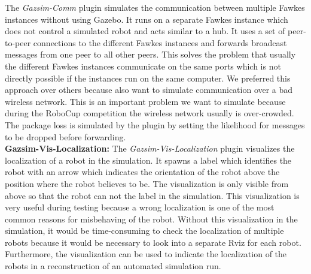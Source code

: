 The \textit{Gazsim-Comm} plugin simulates the communication between multiple Fawkes instances without using Gazebo. It runs on a separate Fawkes instance which does not control a simulated robot and acts similar to a hub. It uses a set of peer-to-peer connections to the different Fawkes instances and forwards broadcast messages from one peer to all other peers. This solves the problem that usually the different Fawkes instances communicate on the same ports which is not directly possible if the instances run on the same computer. We preferred this approach over others because also want to simulate communication over a bad wireless network. This is an important problem we want to simulate because during the RoboCup competition the wireless network usually is over-crowded. The package loss is simulated by the plugin by setting the likelihood for messages to be dropped before forwarding.
\\
\textbf{Gazsim-Vis-Localization:}
The \textit{Gazsim-Vis-Localization} plugin visualizes the localization of a robot in the simulation. It spawns a label which identifies the robot with an arrow which indicates the orientation of the robot above the position where the robot believes to be. The visualization is only visible from above so that the robot can not the label in the simulation. This visualization is very useful during testing because a wrong localization is one of the most common reasons for misbehaving of the robot. Without this visualization in the simulation, it would be time-consuming to check the localization of multiple robots because it would be necessary to look into a separate Rviz for each robot. Furthermore, the visualization can be used to indicate the localization of the robots in a reconstruction of an automated simulation run.
\\


